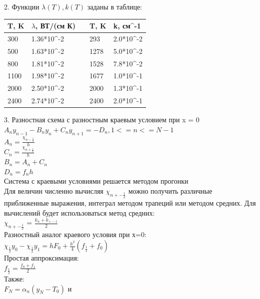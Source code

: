 \documentclass[14pt, a4paper]{extarticle}
\begin{document}
2. Функции $\lambda(T), k(T)$ заданы в таблице:
\begin{table}[h!]
	\begin{tabular}{|l|l|l|l|l|}
		\hline
		T, K & $\lambda$, ВТ/(см К)        &  & T, K & k, см\textasciicircum{}-1  \\ \hline
		300  & 1.36*10\textasciicircum{}-2 &  & 293  & 2.0*10\textasciicircum{}-2 \\ \hline
		500  & 1.63*10\textasciicircum{}-2 &  & 1278 & 5.0*10\textasciicircum{}-2 \\ \hline
		800  & 1.81*10\textasciicircum{}-2 &  & 1528 & 7.8*10\textasciicircum{}-2 \\ \hline
		1100 & 1.98*10\textasciicircum{}-2 &  & 1677 & 1.0*10\textasciicircum{}-1 \\ \hline
		2000 & 2.50*10\textasciicircum{}-2 &  & 2000 & 1.3*10\textasciicircum{}-1 \\ \hline
		2400 & 2.74*10\textasciicircum{}-2 &  & 2400 & 2.0*10\textasciicircum{}-1 \\ \hline
	\end{tabular}
\end{table}\par
3. Разностная схема с разностным краевым условием при x = 0\\
$A_ny_{n-1} - B_ny_n + C_ny_{n+1} = -D_n, 1 <= n <= N - 1$\\
$A_n = \frac{\chi_{n-\frac{1}{2}}}{h}$\\
$C_n = \frac{\chi_{n+\frac{1}{2}}}{h}$\\
$B_n = A_n + C_n$\\
$D_n = f_nh$\\
Система с краевыми условиями решается методом прогонки\\
Для величин численно вычисляя $\chi_{n+-\frac{1}{2}}$ можно получить различные приближенные выражения, интеграл методом трапеций или методом средних. Для вычислений будет использоваться метод средних: \\
$\chi_{n+-\frac{1}{2}}$ = $\frac{k_n + k_{+-1}}{2}$\\
Разностный аналог краевого условия при х=0: \\
$\chi_{\frac{1}{2}}y_0 - \chi_{\frac{1}{2}}y_1 = hF_0 + \frac{h^2}{4}(f_{\frac{1}{2}} + f_0)$\\
Простая аппроксимация:\\
$f_{\frac{1}{2}} = \frac{f_0 + f_1}{2}$\\
Также:\\
$F_N = \alpha_n(y_N - T_0)$ и \\
\end{document}
